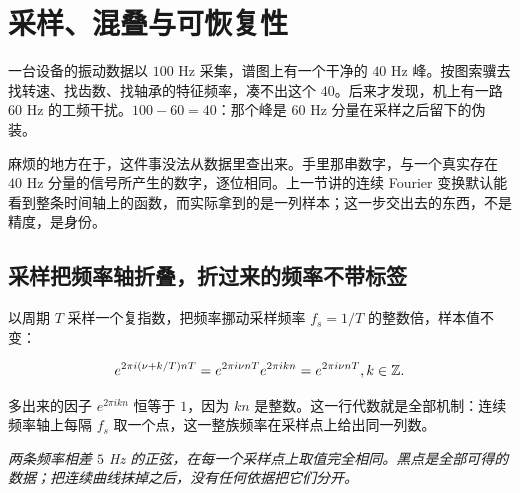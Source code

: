 \section{采样、混叠与可恢复性}
\label{sec:08-Numerical-Analysis/08-Fourier-and-Spectral-Methods/02}

一台设备的振动数据以 \(100\) Hz 采集，谱图上有一个干净的 \(40\) Hz 峰。按图索骥去找转速、找齿数、找轴承的特征频率，凑不出这个 \(40\)。后来才发现，机上有一路 \(60\) Hz 的工频干扰。\(100-60=40\)：那个峰是 \(60\) Hz 分量在采样之后留下的伪装。

麻烦的地方在于，这件事没法从数据里查出来。手里那串数字，与一个真实存在 \(40\) Hz 分量的信号所产生的数字，逐位相同。上一节讲的连续 Fourier 变换默认能看到整条时间轴上的函数，而实际拿到的是一列样本；这一步交出去的东西，不是精度，是身份。

\subsection{采样把频率轴折叠，折过来的频率不带标签}

以周期 \(T\) 采样一个复指数，把频率挪动采样频率 \(f_s=1/T\) 的整数倍，样本值不变：

\[
e^{2\pi i(\nu+k/T)nT}=e^{2\pi i\nu nT}e^{2\pi ikn}=e^{2\pi i\nu nT},
\space k\in\mathbb{Z}.
\]

多出来的因子 \(e^{2\pi ikn}\) 恒等于 \(1\)，因为 \(kn\) 是整数。这一行代数就是全部机制：连续频率轴上每隔 \(f_s\) 取一个点，这一整族频率在采样点上给出同一列数。

\begin{center}

\emph{两条频率相差 \(5\) Hz 的正弦，在每一个采样点上取值完全相同。黑点是全部可得的数据；把连续曲线抹掉之后，没有任何依据把它们分开。}
\end{center}

